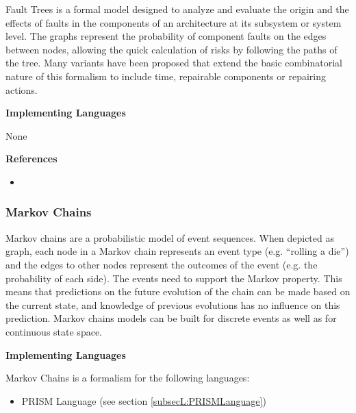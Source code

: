 
Fault Trees is a formal model designed to analyze and evaluate the origin and the effects of faults in the components of an architecture at its subsystem or system level. 
The graphs represent the probability of component faults on the edges between nodes, allowing the quick calculation of risks by following the paths of the tree.
Many variants have been proposed that extend the basic combinatorial nature of this formalism to include time, repairable components or repairing actions.

\textbf{Implementing Languages}

None





\textbf{References}
\begin{itemize}
	
\item {}
\end{itemize}



\subsubsection{Markov Chains}
\label{subsecF:MarkovChains}


Markov chains are a probabilistic model of event sequences.
When depicted as graph, each node in a Markov chain represents an event type (e.g. ``rolling a die'') and the edges to other nodes represent the outcomes of the event (e.g. the probability of each side).
The events need to support the Markov property. This means that predictions on the future evolution of the chain can be made based on the current state, and knowledge of previous evolutions has no influence on this prediction.
Markov chains models can be built for discrete events as well as for continuous state space.

\textbf{Implementing Languages}

Markov Chains is a formalism for the following languages:
\begin{itemize}
	\item PRISM Language (see section \ref{subsecL:PRISMLanguage})
\end{itemize}



